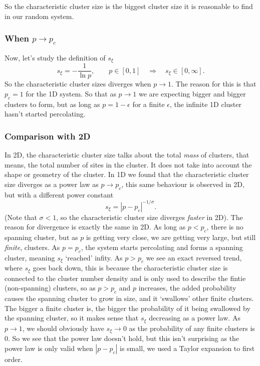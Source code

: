 \documentclass[a4paper, 11pt, notitlepage, english]{article}
\newcommand{\To}{\quad\Rightarrow\quad}
\newcommand{\eps}{\epsilon}
\begin{document}
So the characteristic cluster size is the biggest cluster size it is reasonable to find in our random system.

\subsubsection*{When $p \to p_c$}
Now, let's study the definition of $s_\xi$
$$s_\xi = -\frac{1}{\ln p}, \qquad p\in [0,1] \To s_\xi \in [0, \infty].$$
So the characteristic cluster sizes diverges when $p \to 1$. The reason for this is that $p_c=1$ for the 1D system. So that as $p\to 1$ we are expecting bigger and bigger clusters to form, but as long as $p = 1-\eps$ for a finite  $\eps$, the infinite 1D cluster hasn't started percolating.

\subsubsection*{Comparison with 2D}

In 2D, the characteristic cluster size talks about the total \emph{mass} of clusters, that means, the total number of sites in the cluster. It does not take into account the shape or geometry of the cluster. In 1D we found that the characteristic cluster size diverges as a power law as $p\to p_c$, this same behaviour is observed in 2D, but with a different power constant
$$s_\xi = |p-p_c|^{-1/\sigma}.$$
(Note that $\sigma < 1$, so the characteristic cluster size diverges \emph{faster} in 2D). The reason for divergence is exactly the same in 2D. As long as $p < p_c$, there is no spanning cluster, but as $p$ is getting very close, we are getting very large, but still \emph{finite}, clusters. As $p=p_c$, the system starts percolating and forms a spanning cluster, meaning $s_\xi$ `reached' infity. As $p > p_c$ we see an exact reversed trend, where $s_\xi$ goes back down, this is because the characteristic cluster size is connected to the cluster number density and is only used to describe the fintie (non-spanning) clusters, so as $p > p_c$ and $p$ increases, the added probability causes the spanning cluster to grow in size, and it `swallows' other finite clusters. The bigger a finite cluster is, the bigger the probability of it being swallowed by the spanning cluster, so it makes sense that $s_\xi$ decreasing as a power law. As $p \to 1$, we should obviously have $s_\xi \to 0$ as the probability of any finite clusters is 0. So we see that the power law doesn't hold, but this isn't surprising as the power law is only valid when $|p-p_c|$ is small, we used a Taylor expansion to first order.
\end{document}
